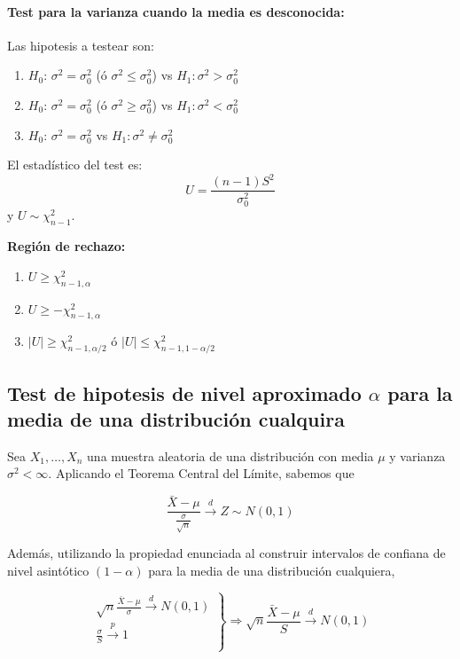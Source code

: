\paragraph{Test para la varianza cuando la media es desconocida:} Las hipotesis a testear son:

\begin{enumerate}
	\item $H_0$: $\sigma^2 = \sigma^2_0$ (ó $\sigma^2 \leq \sigma^2_0$) vs  $H_1: \sigma^2 > \sigma^2_0$
	\item $H_0$: $\sigma^2 = \sigma^2_0$ (ó $\sigma^2 \geq \sigma^2_0$) vs  $H_1: \sigma^2 < \sigma^2_0$
	\item $H_0$: $\sigma^2 = \sigma^2_0$ vs  $H_1: \sigma^2 \neq \sigma^2_0$
\end{enumerate}

El estadístico del test es: $$U =\frac{(n-1)S^2}{\sigma^2_0}$$ y $U\sim \chi^2_{n-1}$.

\textbf{Región de rechazo:}
\begin{enumerate}
	\item $U\geq \chi^2_{n-1,\alpha}$
	\item $U \geq -\chi^2_{n-1,\alpha}$
	\item $|U| \geq \chi^2_{n-1,\alpha/2}$ ó $|U| \leq \chi^2_{n-1,1-\alpha/2}$
\end{enumerate}

\subsection{Test de hipotesis de nivel aproximado \texorpdfstring{$\alpha$}{alfa} para la media de una distribución cualquira}
Sea $X_1,\dots,X_n$ una muestra aleatoria de una distribución con media $\mu$ y varianza $\sigma^2 < \infty$. Aplicando el Teorema Central del Límite, sabemos que 

$$\frac{\bar{X} - \mu}{\frac{\sigma}{\sqrt{n}}}\overset{d}{\longrightarrow} Z\sim N(0,1)$$

Además, utilizando la propiedad enunciada al construir intervalos de confiana de nivel asintótico $(1-\alpha)$ para la media de una distribución cualquiera,

$$\left.\begin{array}{r}
\sqrt{n}\frac{\bar{X} - \mu}{\sigma}\overset{d}{\longrightarrow} N(0,1) \\
\frac{\sigma}{S}\overset{p}{\longrightarrow} 1 \\
\end{array}\right\} \Rightarrow\sqrt{n}\frac{\bar{X} - \mu}{S}\overset{d}{\longrightarrow} N(0,1)$$

